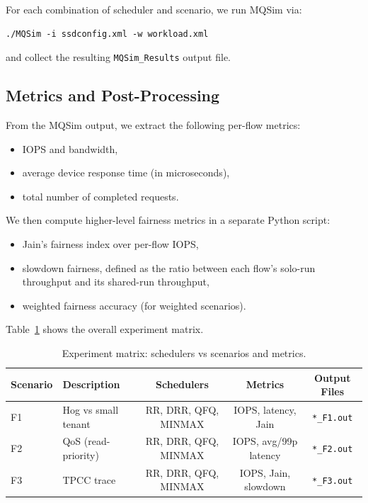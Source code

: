 \documentclass[11pt]{article}
\begin{document}
For each combination of scheduler and scenario, we run MQSim via:
\begin{verbatim}
./MQSim -i ssdconfig.xml -w workload.xml
\end{verbatim}
and collect the resulting \texttt{MQSim\_Results} output file.

\subsection{Metrics and Post-Processing}

From the MQSim output, we extract the following per-flow metrics:
\begin{itemize}
    \item IOPS and bandwidth,
    \item average device response time (in microseconds),
    \item total number of completed requests.
\end{itemize}

We then compute higher-level fairness metrics in a separate Python script:
\begin{itemize}
    \item Jain's fairness index over per-flow IOPS,
    \item slowdown fairness, defined as the ratio between each flow's solo-run
    throughput and its shared-run throughput,
    \item weighted fairness accuracy (for weighted scenarios).
\end{itemize}

Table~\ref{tab:exp-matrix} shows the overall experiment matrix.

\begin{table}[h]
    \centering
    \caption{Experiment matrix: schedulers vs scenarios and metrics.}
    \label{tab:exp-matrix}
    \begin{tabular}{llccc}
        \toprule
        Scenario & Description & Schedulers & Metrics & Output Files \\
        \midrule
        F1 & Hog vs small tenant &
        RR, DRR, QFQ, MINMAX &
        IOPS, latency, Jain &
        \texttt{*{\_}F1.out} \\
        F2 & QoS (read-priority) &
        RR, DRR, QFQ, MINMAX &
        IOPS, avg/99p latency &
        \texttt{*{\_}F2.out} \\
        F3 & TPCC trace &
        RR, DRR, QFQ, MINMAX &
        IOPS, Jain, slowdown &
        \texttt{*{\_}F3.out} \\
        \bottomrule
    \end{tabular}
\end{table}
\end{document}
